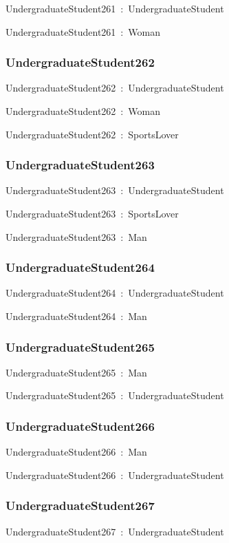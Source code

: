 \documentclass{article}
\begin{document}
UndergraduateStudent261~:~UndergraduateStudent

UndergraduateStudent261~:~Woman

\subsubsection*{UndergraduateStudent262}

UndergraduateStudent262~:~UndergraduateStudent

UndergraduateStudent262~:~Woman

UndergraduateStudent262~:~SportsLover

\subsubsection*{UndergraduateStudent263}

UndergraduateStudent263~:~UndergraduateStudent

UndergraduateStudent263~:~SportsLover

UndergraduateStudent263~:~Man

\subsubsection*{UndergraduateStudent264}

UndergraduateStudent264~:~UndergraduateStudent

UndergraduateStudent264~:~Man

\subsubsection*{UndergraduateStudent265}

UndergraduateStudent265~:~Man

UndergraduateStudent265~:~UndergraduateStudent

\subsubsection*{UndergraduateStudent266}

UndergraduateStudent266~:~Man

UndergraduateStudent266~:~UndergraduateStudent

\subsubsection*{UndergraduateStudent267}

UndergraduateStudent267~:~UndergraduateStudent
\end{document}
